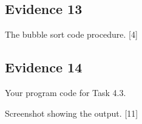 \subsection*{Evidence 13 }

The bubble sort code procedure.\hfill{} {[}4{]}

\subsection*{Evidence 14 }

Your program code for Task 4.3.

Screenshot showing the output.\hfill{} {[}11{]}